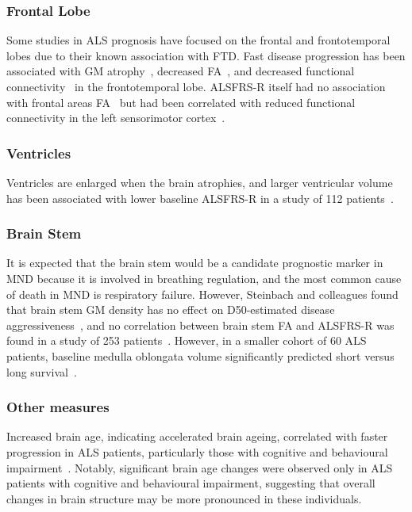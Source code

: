 \subsubsection*{Frontal Lobe}
Some studies in ALS prognosis have focused on the frontal and frontotemporal lobes due to their known association with FTD.
Fast disease progression has been associated with GM atrophy~\cite{sendaStructuralMRICorrelates2017}, decreased FA~\cite{sendaStructuralMRICorrelates2017,kalraProspectiveHarmonizedMulticenter2020}, and decreased functional connectivity~\cite{trojsiRestingStateFunctional2021} in the frontotemporal lobe.
ALSFRS-R itself had no association with frontal areas FA~\cite{mullerLargescaleMulticentreCerebral2016} but had been correlated with reduced functional connectivity in the left sensorimotor cortex~\cite{agostaSensorimotorFunctionalConnectivity2011}.

\subsubsection*{Ventricles}
Ventricles are enlarged when the brain atrophies, and larger ventricular volume has been associated with lower baseline ALSFRS-R in a study of 112 patients~\cite{westenengSubcorticalStructuresAmyotrophic2015}.

\subsubsection*{Brain Stem}
It is expected that the brain stem would be a candidate prognostic marker in MND because it is involved in breathing regulation, and the most common cause of death in MND is respiratory failure.
However, Steinbach and colleagues found that brain stem GM density has no effect on D50-estimated disease aggressiveness~\cite{steinbachApplyingD50Disease2020}, and no correlation between brain stem FA and ALSFRS-R was found in a study of 253 patients~\cite{mullerLargescaleMulticentreCerebral2016}.
However, in a smaller cohort of 60 ALS patients, baseline medulla oblongata volume significantly predicted short versus long survival~\cite{milellaMedullaOblongataVolume2022}.

\subsubsection*{Other measures}
Increased brain age, indicating accelerated brain ageing, correlated with faster progression in ALS patients, particularly those with cognitive and behavioural impairment~\cite{hermannCognitiveBehaviouralNot2022}.
Notably, significant brain age changes were observed only in ALS patients with cognitive and behavioural impairment, suggesting that overall changes in brain structure may be more pronounced in these individuals.

